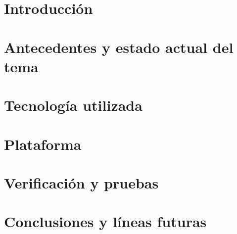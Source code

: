 \documentclass[spanish,a4paper,14pt,oneside]{extreport}
\begin{document}
   
  \chapter{Introducción}
  \label{chapter:intro}
   
  
   
   
  \chapter{Antecedentes y estado actual del tema}
  \label{chapter:Estadodelarte}
   
  
   
  \newpage{\pagestyle{empty}}
  \thispagestyle{empty}
   
  \chapter{Tecnología utilizada}
  \label{chapter:tres}
   
  
   
   
  \chapter{Plataforma}
  \label{chapter:cuatro}
   
  
   
  \newpage{\pagestyle{empty}}
  \thispagestyle{empty}
   
  \chapter{Verificación y pruebas}
  \label{chapter:cinco}
   
  
   
  \newpage{\pagestyle{empty}}
  \thispagestyle{empty}
   
  \chapter{Conclusiones y líneas futuras}
  \label{chapter:conclusiones}
   
\end{document}

